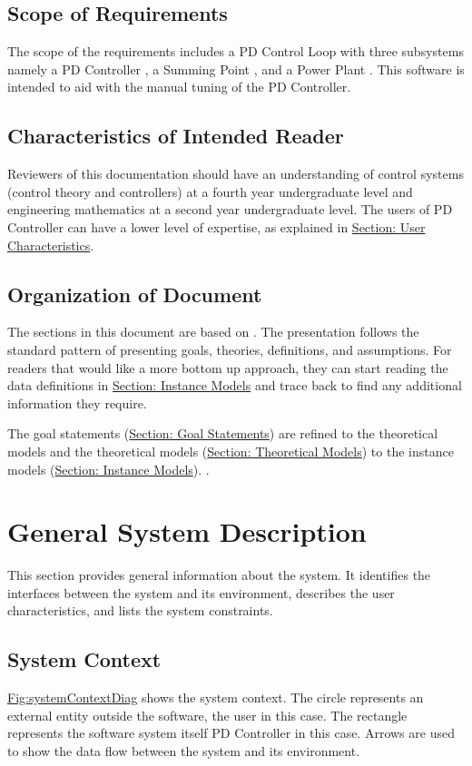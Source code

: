 \documentclass[12pt]{article}
\begin{document}
\subsection{Scope of Requirements}
\label{Sec:ReqsScope}
The scope of the requirements includes a PD Control Loop  with three subsystems namely a  PD Controller , a Summing Point , and a Power Plant . This  software is intended to aid with the manual tuning of the PD Controller.

\subsection{Characteristics of Intended Reader}
\label{Sec:ReaderChars}
Reviewers of this documentation should have an understanding of control systems (control theory and controllers) at a fourth year undergraduate level and engineering mathematics at a second year undergraduate level. The users of PD Controller can have a lower level of expertise, as explained in \hyperref[Sec:UserChars]{Section: User Characteristics}.

\subsection{Organization of Document}
\label{Sec:DocOrg}
The sections in this document are based on  \cite{smithLai2005}. The presentation follows the standard pattern of presenting goals, theories, definitions, and assumptions. For readers that would like a more bottom up approach, they can start reading the data definitions in \hyperref[Sec:IMs]{Section: Instance Models} and trace back to find any additional information they require.

The goal statements (\hyperref[Sec:GoalStmt]{Section: Goal Statements}) are refined to the theoretical models and the theoretical models (\hyperref[Sec:TMs]{Section: Theoretical Models}) to the instance models (\hyperref[Sec:IMs]{Section: Instance Models}). .

\section{General System Description}
\label{Sec:GenSysDesc}
This section provides general information about the system. It identifies the interfaces between the system and its environment, describes the user characteristics, and lists the system constraints.

\subsection{System Context}
\label{Sec:SysContext}
\hyperref[Figure:systemContextDiag]{Fig:systemContextDiag} shows the system context. The circle represents an external entity outside the software, the user in this case. The rectangle represents the software system itself PD Controller in this case. Arrows are used to show the data flow between the system and its environment.
\end{document}
